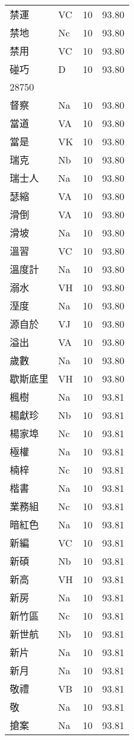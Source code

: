 \documentclass[twocolumn]{book}
\begin{document}
\begin{supertabular}{llrr}
禁運 & VC & 10 &  93.80\\
禁地 & Nc & 10 &  93.80\\
禁用 & VC & 10 &  93.80\\
碰巧 & D & 10 &  93.80\\
28750\\
督察 & Na & 10 &  93.80\\
當道 & VA & 10 &  93.80\\
當是 & VK & 10 &  93.80\\
瑞克 & Nb & 10 &  93.80\\
瑞士人 & Na & 10 &  93.80\\
瑟縮 & VA & 10 &  93.80\\
滑倒 & VA & 10 &  93.80\\
滑坡 & Na & 10 &  93.80\\
溫習 & VC & 10 &  93.80\\
溫度計 & Na & 10 &  93.80\\
溺水 & VH & 10 &  93.80\\
溼度 & Na & 10 &  93.80\\
源自於 & VJ & 10 &  93.80\\
溢出 & VA & 10 &  93.80\\
歲數 & Na & 10 &  93.80\\
歇斯底里 & VH & 10 &  93.80\\
楓樹 & Na & 10 &  93.81\\
楊獻珍 & Nb & 10 &  93.81\\
楊家埠 & Nc & 10 &  93.81\\
極權 & Na & 10 &  93.81\\
楠梓 & Nc & 10 &  93.81\\
楷書 & Na & 10 &  93.81\\
業務組 & Nc & 10 &  93.81\\
暗紅色 & Na & 10 &  93.81\\
新編 & VC & 10 &  93.81\\
新碩 & Nb & 10 &  93.81\\
新高 & VH & 10 &  93.81\\
新房 & Na & 10 &  93.81\\
新竹區 & Nc & 10 &  93.81\\
新世航 & Nb & 10 &  93.81\\
新片 & Na & 10 &  93.81\\
新月 & Na & 10 &  93.81\\
敬禮 & VB & 10 &  93.81\\
敬 & Na & 10 &  93.81\\
搶案 & Na & 10 &  93.81\\

\end{supertabular}
\end{document}
